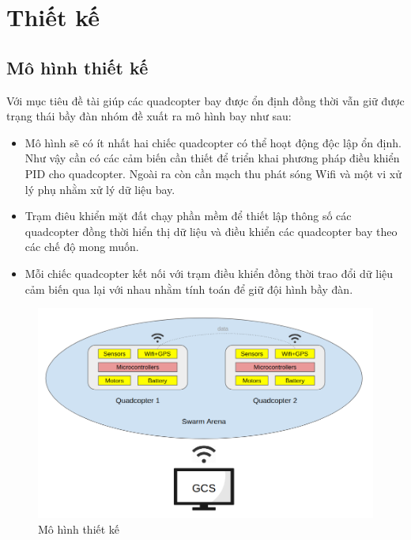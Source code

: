 \chapter{Thiết kế}

\section{Mô hình thiết kế}
    Với mục tiêu đề tài giúp các quadcopter bay được ổn định đồng thời vẫn giữ được trạng thái bầy đàn nhóm đề xuất ra mô hình bay như sau:
    \begin{itemize}
    	\item Mô hình sẽ có ít nhất hai chiếc quadcopter có thể hoạt động độc lập ổn định. Như vậy cần có các cảm biến cần thiết để triển khai phương pháp điều khiển PID cho quadcopter. Ngoài ra còn cần mạch thu phát sóng Wifi và một vi xử lý phụ nhằm xử lý dữ liệu bay.
    	\item Trạm điêu khiển mặt đất chạy phần mềm để thiết lập thông số các quadcopter đồng thời hiển thị dữ liệu và điều khiển các quadcopter bay theo các chế độ mong muốn.
    	\item Mỗi chiếc quadcopter kết nối với trạm điều khiển đồng thời trao đổi dữ liệu cảm biến qua lại với nhau nhằm tính toán để giữ đội hình bầy đàn.
    \end{itemize}
    
    \begin{figure}[h!]
    	\begin{center}
    		\includegraphics[scale=0.45]{images/design_model.png}
    		\caption{Mô hình thiết kế}
    	\end{center}
    \end{figure}
    
